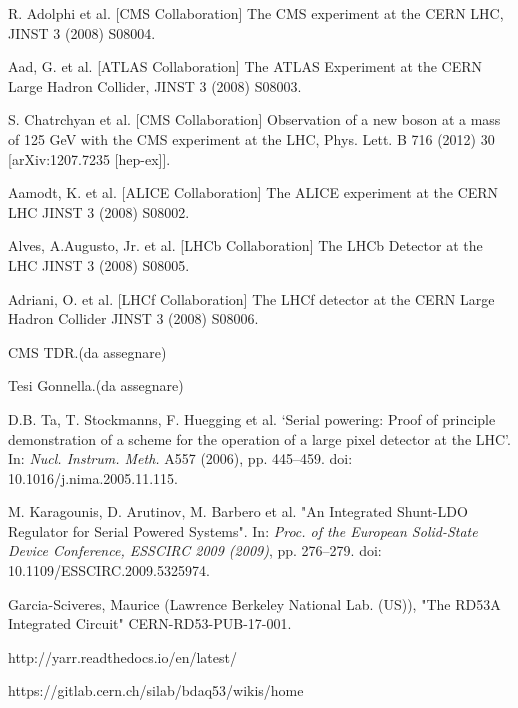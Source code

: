 \begin{thebibliography}{1}

 R. Adolphi et al. [CMS Collaboration] The CMS experiment at the CERN LHC,
JINST 3 (2008) S08004.

Aad, G. et al. [ATLAS Collaboration] The ATLAS Experiment at the CERN Large
Hadron Collider, JINST 3 (2008) S08003. 

 S. Chatrchyan et al. [CMS Collaboration] Observation of a new boson at a mass of 125 GeV with the CMS experiment at the LHC, Phys. Lett. B 716 (2012) 30 [arXiv:1207.7235 [hep-ex]].


Aamodt, K. et al. [ALICE Collaboration] The ALICE experiment at the CERN
LHC JINST 3 (2008) S08002.

Alves, A.Augusto, Jr. et al. [LHCb Collaboration] The LHCb Detector at the LHC
JINST 3 (2008) S08005.

Adriani, O. et al. [LHCf Collaboration] The LHCf detector at the CERN Large
Hadron Collider JINST 3 (2008) S08006.

 CMS TDR.(da assegnare)






% 



 Tesi Gonnella.(da assegnare)

 D.B. Ta, T. Stockmanns, F. Huegging et al. ‘Serial powering: Proof of principle demonstration of a scheme for the operation of a large pixel detector at the LHC’. In: \textit{Nucl. Instrum. Meth.} A557 (2006), pp. 445–459. doi: 10.1016/j.nima.2005.11.115.

 M. Karagounis, D. Arutinov, M. Barbero et al. "An Integrated Shunt-LDO Regulator
for Serial Powered Systems". In: \textit{Proc. of the European Solid-State Device Conference,
ESSCIRC 2009 (2009)}, pp. 276–279. doi: 10.1109/ESSCIRC.2009.5325974.

 Garcia-Sciveres, Maurice (Lawrence Berkeley National Lab. (US)), "The RD53A Integrated Circuit" CERN-RD53-PUB-17-001.

 http://yarr.readthedocs.io/en/latest/

 https://gitlab.cern.ch/silab/bdaq53/wikis/home

\end{thebibliography}